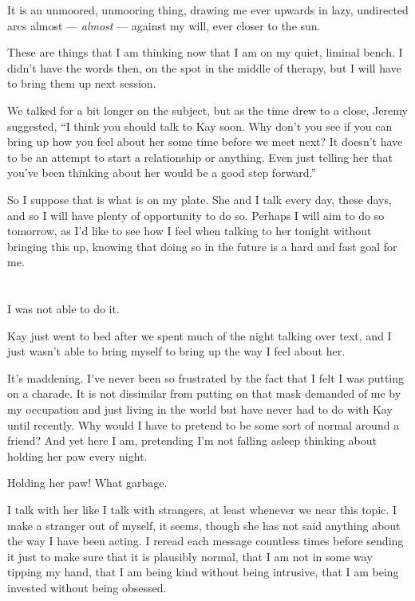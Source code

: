 It is an unmoored, unmooring thing, drawing me ever upwards in lazy, undirected arcs almost --- \emph{almost} --- against my will, ever closer to the sun.

These are things that I am thinking now that I am on my quiet, liminal bench. I didn't have the words then, on the spot in the middle of therapy, but I will have to bring them up next session.

We talked for a bit longer on the subject, but as the time drew to a close, Jeremy suggested, ``I think you should talk to Kay soon. Why don't you see if you can bring up how you feel about her some time before we meet next? It doesn't have to be an attempt to start a relationship or anything. Even just telling her that you've been thinking about her would be a good step forward.''

So I suppose that is what is on my plate. She and I talk every day, these days, and so I will have plenty of opportunity to do so. Perhaps I will aim to do so tomorrow, as I'd like to see how I feel when talking to her tonight without bringing this up, knowing that doing so in the future is a hard and fast goal for me.

\section{}

I was not able to do it.

Kay just went to bed after we spent much of the night talking over text, and I just wasn't able to bring myself to bring up the way I feel about her.

It's maddening. I've never been so frustrated by the fact that I felt I was putting on a charade. It is not dissimilar from putting on that mask demanded of me by my occupation and just living in the world but have never had to do with Kay until recently. Why would I have to pretend to be some sort of normal around a friend? And yet here I am, pretending I'm not falling asleep thinking about holding her paw every night.

Holding her paw! What garbage.

I talk with her like I talk with strangers, at least whenever we near this topic. I make a stranger out of myself, it seems, though she has not said anything about the way I have been acting. I reread each message countless times before sending it just to make sure that it is plausibly normal, that I am not in some way tipping my hand, that I am being kind without being intrusive, that I am being invested without being obsessed.

